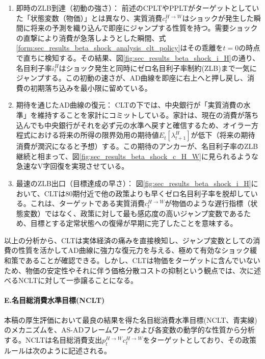 \begin{enumerate}
    \item\label{itm:sec_results_beta_shock_analysis_clt_zlb} 即時のZLB到達（初動の強さ）：
    前述のCPLTやPPLTがターゲットとしていた「状態変数（物価）」とは異なり、実質消費\(c_t^{H\to W}\)はショックが発生した瞬間に将来の予測を織り込んで即座にジャンプする性質を持つ。需要ショックの直撃により消費が急落しようとした瞬間、式\eqref{form:sec_results_beta_shock_analysis_clt_policy}はその乖離を\(t=0\)の時点で直ちに検知する。その結果、図\ref{fig:sec_results_beta_shock_i_H}の通り、名目利子率\(i_t^H\)はショック発生と同時にゼロ名目利子率制約(ZLB)まで一気にジャンプする。この初動の速さが、AD曲線を即座に右上へと押し戻し、消費の初期落ち込みを最小限に留めている。
    \item\label{itm:sec_results_beta_shock_analysis_clt_expectation} 期待を通じたAD曲線の復元：
    CLTの下では、中央銀行が「実質消費の水準」を維持することを家計にコミットしている。家計は、現在の消費が落ち込んでも中央銀行がそれを必ず元の水準へ戻すと確信するため、オイラー方程式における将来の所得の限界効用の期待値\(E_t[\lambda_{t+1}^H]\)が低下（将来の期待消費が潤沢になると予想）する。この期待のアンカーが、名目利子率のZLB継続と相まって、図\ref{fig:sec_results_beta_shock_c_H_W}に見られるような急速なV字回復を実現させている。
    \item\label{itm:sec_results_beta_shock_analysis_clt_exit} 最速のZLB出口（目標達成の早さ）：
    図\ref{fig:sec_results_beta_shock_i_H}において、CLTは80期付近で他の政策よりも早くゼロ名目利子率を脱却している。これは、ターゲットである実質消費\(c_t^{H\to W}\)が物価のような遅行指標（状態変数）ではなく、政策に対して最も感応度の高いジャンプ変数であるため、目標とする定常状態への復帰が早期に完了したことを意味する。
\end{enumerate}

以上の分析から、CLTは実体経済の痛みを直接検知し、ジャンプ変数としての消費の性質を活かしてAD曲線に強力な復元力を与える、極めて有効なショック緩和策であることが確認できる。しかし、CLTは物価をターゲットに含んでいないため、物価の安定性やそれに伴う価格分散コストの抑制という観点では、次に述べるNCLTに対して一歩譲ることになる。

\paragraph{E.名目総消費水準目標(NCLT)}\label{sec:sec_results_beta_shock_analysis_nclt}
本稿の厚生評価において最良の結果を得た名目総消費水準目標(NCLT、青実線)のメカニズムを、AS-ADフレームワークおよび各変数の動学的な性質から分析する。NCLTは名目総消費支出\(p_t^{H\to W}c_t^{H\to W}\)をターゲットとしており、その政策ルールは次のように記述される。

